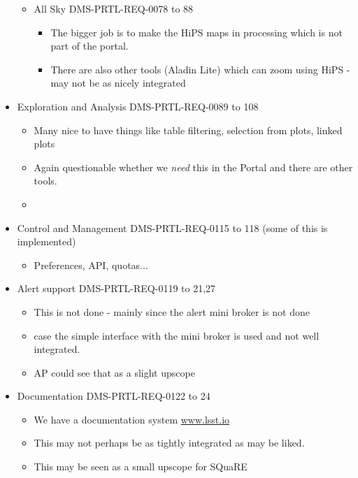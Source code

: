 \begin{itemize}
\begin{itemize}
\item All Sky  DMS-PRTL-REQ-0078 to 88
\begin{itemize}
\item The bigger job is to make the HiPS maps in  processing which is not part of the portal.
\item There are also other tools (Aladin Lite) which can zoom using HiPS - may not be as nicely integrated
\end{itemize}

\end{itemize}

\item Exploration and Analysis DMS-PRTL-REQ-0089 to 108
\begin{itemize}
\item Many nice to have things like table filtering, selection from plots, linked plots
\item Again questionable whether we \emph{need} this in the Portal and there are other tools.
\item {}
\end{itemize}

\item Control and Management DMS-PRTL-REQ-0115 to 118 (some of this is implemented)
\begin{itemize}
\item Preferences, API, quotas...
\end{itemize}
\item Alert support DMS-PRTL-REQ-0119 to 21,27
\begin{itemize}
\item This is not done - mainly since the alert mini broker is not done
\item {}  case\newtext{,} the simple interface   with the mini broker is used and not well integrated.
\item AP could see that as a slight upscope
\end{itemize}

\item Documentation DMS-PRTL-REQ-0122 to 24
\begin{itemize}
\item  We have a documentation system \url{www.lsst.io}
\item This may not perhaps be  as tightly integrated as may be liked.
\item This may be seen as a small upscope for SQuaRE
\end{itemize}
\end{itemize}

